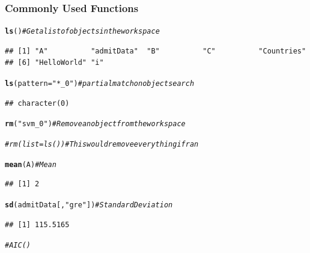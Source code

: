 \documentclass{beamer}\usepackage[]{graphicx}\usepackage[]{color}
\makeatletter
\newcommand{\hlstr}[1]{\textcolor[rgb]{0.192,0.494,0.8}{#1}}%
\newcommand{\hlcom}[1]{\textcolor[rgb]{0.678,0.584,0.686}{\textit{#1}}}%
\newcommand{\hlstd}[1]{\textcolor[rgb]{0.345,0.345,0.345}{#1}}%
\newcommand{\hlkwc}[1]{\textcolor[rgb]{0.333,0.667,0.333}{#1}}%
\newcommand{\hlkwd}[1]{\textcolor[rgb]{0.737,0.353,0.396}{\textbf{#1}}}%
\newenvironment{kframe}{%
 \def\at@end@of@kframe{}%
 \ifinner\ifhmode%
  \def\at@end@of@kframe{\end{minipage}}%
  \begin{minipage}{\columnwidth}%
 \fi\fi%
 \def\FrameCommand##1{\hskip\@totalleftmargin \hskip-\fboxsep
 \colorbox{shadecolor}{##1}\hskip-\fboxsep
     \hskip-\linewidth \hskip-\@totalleftmargin \hskip\columnwidth}%
 \MakeFramed {\advance\hsize-\width
   \@totalleftmargin\z@ \linewidth\hsize
   \@setminipage}}%
 {\par\unskip\endMakeFramed%
 \at@end@of@kframe}
\newenvironment{knitrout}{}{} %
\makeatother
\begin{document}
\begin{frame}
\frametitle{Commonly Used Functions}
\begin{knitrout}\scriptsize
{}\color{fgcolor}\begin{kframe}
\begin{alltt}
\hlkwd{ls}\hlstd{()}  \hlcom{# Get a list of objects in the workspace}
\end{alltt}
\begin{verbatim}
## [1] "A"          "admitData"  "B"          "C"          "Countries" 
## [6] "HelloWorld" "i"
\end{verbatim}
\begin{alltt}
\hlkwd{ls}\hlstd{(}\hlkwc{pattern} \hlstd{=} \hlstr{"*_0"}\hlstd{)}  \hlcom{# partial match on object search}
\end{alltt}
\begin{verbatim}
## character(0)
\end{verbatim}
\begin{alltt}
\hlkwd{rm}\hlstd{(}\hlstr{"svm_0"}\hlstd{)}  \hlcom{# Remove an object from the workspace}
\end{alltt}


{\ttfamily\noindent{}}\begin{alltt}
\hlcom{# rm(list=ls()) # This would remove everything if ran}
\end{alltt}
\end{kframe}
\end{knitrout}


\begin{knitrout}\scriptsize
{}\color{fgcolor}\begin{kframe}
\begin{alltt}
\hlkwd{mean}\hlstd{(A)}  \hlcom{# Mean}
\end{alltt}
\begin{verbatim}
## [1] 2
\end{verbatim}
\begin{alltt}
\hlkwd{sd}\hlstd{(admitData[,} \hlstr{"gre"}\hlstd{])}  \hlcom{# Standard Deviation}
\end{alltt}
\begin{verbatim}
## [1] 115.5165
\end{verbatim}
\begin{alltt}
\hlcom{# AIC()}
\end{alltt}
\end{kframe}
\end{knitrout}




\end{frame}
\end{document}
